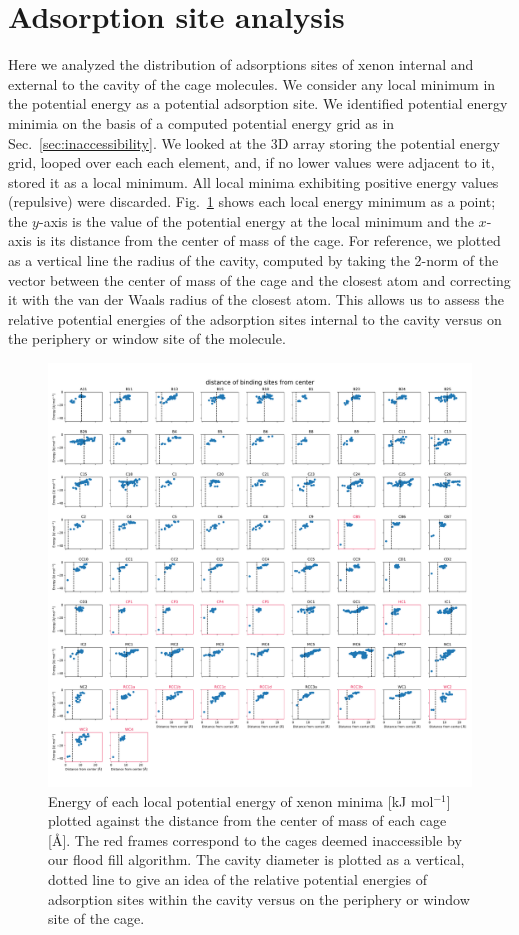 \documentclass[journal=jacsat,manuscript=article]{achemso}
\begin{document}
{\section{\color{red}Adsorption site analysis}
Here we analyzed the distribution of adsorptions sites of xenon internal and external to the cavity of the cage molecules. We consider any local minimum in the potential energy as a potential adsorption site. We identified potential energy minimia on the basis of a computed potential energy grid as in Sec.~\ref{sec:inaccessibility}. We looked at the 3D array storing the potential energy grid, looped over each each element, and, if no lower values were adjacent to it, stored it as a local minimum. All local minima exhibiting positive energy values (repulsive) were discarded. 
Fig.~\ref{fig:energy_vs_dist} shows each local energy minimum as a point; the $y$-axis is the value of the potential energy at the local minimum and the $x$-axis is its distance from the center of mass of the cage. For reference, we plotted as a vertical line the radius of the cavity, computed by taking the 2-norm of the vector between the center of mass of the cage and the closest atom and correcting it with the van der Waals radius of the closest atom. This allows us to assess the relative potential energies of the adsorption sites internal to the cavity versus on the periphery or window site of the molecule.}

\begin{figure}
\centering
	\includegraphics[width=\columnwidth]{../distance_of_binding_sites.pdf}
	\caption{{\color{red}Energy of each local potential energy of xenon minima [kJ mol$^{-1}$] plotted against the distance from the center of mass of each cage [\AA]. The red frames correspond to the cages deemed inaccessible by our flood fill algorithm. The cavity diameter is plotted as a vertical, dotted line to give an idea of the relative potential energies of adsorption sites within the cavity versus on the periphery or window site of the cage.}
	} \label{fig:energy_vs_dist}
\end{figure}
\end{document}
